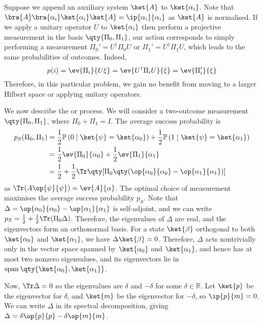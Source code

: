 Suppose we append an auxiliary system $\ket{A}$ to $\ket{\alpha_i}$.
Note that $\bra{A}\bra{\alpha_i}\ket{\alpha_i}\ket{A} = \ip{\alpha_i}{\alpha_i}$ as $\ket{A}$ is normalised.
If we apply a unitary operator $U$ to $\ket{\alpha_i}$ then perform a projective measurement in the basis $\qty{\Pi_0, \Pi_1}$, our action corresponds to simply performing a measurement $\Pi_0' = U^\dagger \Pi_0 U$ or $\Pi_1' = U^\dagger \Pi_1 U$, which leads to the same probabilities of outcomes.
Indeed,
\[ p(i) = \ev{\Pi_i}{U\xi} = \ev{U^\dagger \Pi_i U}{\xi} = \ev{\Pi_i'}{\xi} \]
Therefore, in this particular problem, we gain no benefit from moving to a larger Hilbert space or applying unitary operators.

We now describe the  or  process.
We will consider a two-outcome measurement $\qty{\Pi_0, \Pi_1}$, where $\Pi_0 + \Pi_1 = I$.
The average success probability is
\begin{align*}
    p_S(\Pi_0, \Pi_1) &= \frac{1}{2} \prob{0 \mid \ket{\psi} = \ket{\alpha_0}} + \frac{1}{2} \prob{1 \mid \ket{\psi} = \ket{\alpha_1}} \\
    &= \frac{1}{2}\ev{\Pi_0}{\alpha_0} + \frac{1}{2}\ev{\Pi_1}{\alpha_1} \\
    &= \frac{1}{2} + \frac{1}{2} \Tr \qty[\Pi_0 \qty(\op{\alpha_0}{\alpha_0} - \op{\alpha_1}{\alpha_1})]
\end{align*}
as $\Tr(A\op{\psi}{\psi}) = \ev{A}{\alpha}$.
The optimal choice of measurement maximises the average success probability $p_S$.
Note that $\Delta = \op{\alpha_0}{\alpha_0} - \op{\alpha_1}{\alpha_1}$ is self-adjoint, and we can write $p_S = \frac{1}{2} + \frac{1}{2} \Tr(\Pi_0 \Delta)$.
Therefore, the eigenvalues of $\Delta$ are real, and the eigenvectors form an orthonormal basis.
For a state $\ket{\beta}$ orthogonal to both $\ket{\alpha_0}$ and $\ket{\alpha_1}$, we have $\Delta \ket{\beta} = 0$.
Therefore, $\Delta$ acts nontrivially only in the vector space spanned by $\ket{\alpha_0}$ and $\ket{\alpha_1}$, and hence has at most two nonzero eigenvalues, and its eigenvectors lie in $\vecspan\qty{\ket{\alpha_0}, \ket{\alpha_1}}$.

Now, $\Tr\Delta = 0$ so the eigenvalues are $\delta$ and $-\delta$ for some $\delta \in \mathbb R$.
Let $\ket{p}$ be the eigenvector for $\delta$, and $\ket{m}$ be the eigenvector for $-\delta$, so $\ip{p}{m} = 0$.
We can write $\Delta$ in its spectral decomposition, giving $\Delta = \delta \op{p}{p} - \delta \op{m}{m}$.

